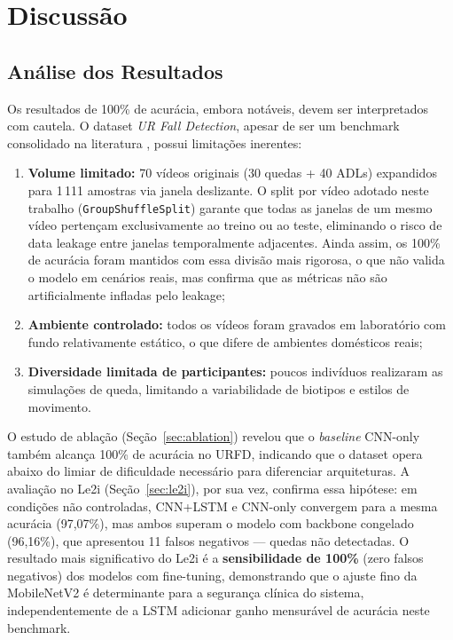 \documentclass[12pt,a4paper]{article}
\begin{document}
\section{Discussão}

\subsection{Análise dos Resultados}
\label{sec:discussao}

Os resultados de 100\% de acurácia, embora notáveis, devem ser interpretados com cautela. O dataset \textit{UR Fall Detection}, apesar de ser um benchmark consolidado na literatura \citep{kwolek2014}, possui limitações inerentes:

\begin{enumerate}[nosep]
  \item \textbf{Volume limitado:} 70 vídeos originais (30 quedas + 40 ADLs) expandidos para 1\,111 amostras via janela deslizante. O split por vídeo adotado neste trabalho (\texttt{GroupShuffleSplit}) garante que todas as janelas de um mesmo vídeo pertençam exclusivamente ao treino ou ao teste, eliminando o risco de data leakage entre janelas temporalmente adjacentes. Ainda assim, os 100\% de acurácia foram mantidos com essa divisão mais rigorosa, o que não valida o modelo em cenários reais, mas confirma que as métricas não são artificialmente infladas pelo leakage;
  \item \textbf{Ambiente controlado:} todos os vídeos foram gravados em laboratório com fundo relativamente estático, o que difere de ambientes domésticos reais;
  \item \textbf{Diversidade limitada de participantes:} poucos indivíduos realizaram as simulações de queda, limitando a variabilidade de biotipos e estilos de movimento.
\end{enumerate}

O estudo de ablação (Seção~\ref{sec:ablation}) revelou que o \textit{baseline} CNN-only também alcança 100\% de acurácia no URFD, indicando que o dataset opera abaixo do limiar de dificuldade necessário para diferenciar arquiteturas. A avaliação no Le2i (Seção~\ref{sec:le2i}), por sua vez, confirma essa hipótese: em condições não controladas, CNN+LSTM e CNN-only convergem para a mesma acurácia (97,07\%), mas ambos superam o modelo com backbone congelado (96,16\%), que apresentou 11 falsos negativos — quedas não detectadas. O resultado mais significativo do Le2i é a \textbf{sensibilidade de 100\%} (zero falsos negativos) dos modelos com fine-tuning, demonstrando que o ajuste fino da MobileNetV2 é determinante para a segurança clínica do sistema, independentemente de a LSTM adicionar ganho mensurável de acurácia neste benchmark.
\end{document}
